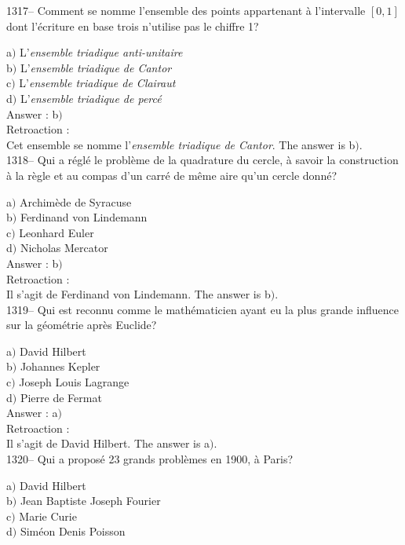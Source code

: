 ﻿\documentclass[letterpaper, 12pt]{article}
\begin{document}
1317-- Comment se nomme l'ensemble des points appartenant \`a
l'intervalle $[0,1]$ dont l'\'ecriture en base trois n'utilise pas
le chiffre 1?

a$)$ L'{\sl ensemble triadique anti-unitaire} \\
b$)$ L'{\sl ensemble triadique de Cantor} \\
c$)$ L'{\sl ensemble triadique de Clairaut} \\
d$)$ L'{\sl ensemble triadique de perc\'e}\\

Answer : b$)$\\

Retroaction : \\
Cet ensemble se nomme l'{\sl ensemble triadique de Cantor}.
The answer is  b$)$.\\

1318-- Qui a r\'egl\'e le probl\`eme de la quadrature du cercle, \`a
savoir la construction \`a la r\`egle et au compas d'un carr\'e de
m\^eme aire qu'un cercle donn\'e?

a$)$ Archim\`ede de Syracuse \\
b$)$ Ferdinand von Lindemann \\
c$)$ Leonhard Euler \\
d$)$ Nicholas Mercator\\

Answer : b$)$\\

Retroaction : \\
Il s'agit de Ferdinand von Lindemann.
The answer is  b$)$.\\

1319-- Qui est reconnu comme le math\'ematicien ayant eu la plus
grande influence sur la g\'eom\'etrie apr\`es Euclide?

a$)$ David Hilbert \\
b$)$ Johannes Kepler \\
c$)$ Joseph Louis Lagrange \\
d$)$ Pierre de Fermat\\

Answer : a$)$\\

Retroaction : \\
Il s'agit de David Hilbert.
The answer is  a$)$.\\

1320-- Qui a propos\'e 23 grands probl\`emes en 1900, \`a Paris?

a$)$ David Hilbert \\
b$)$ Jean Baptiste Joseph Fourier \\
c$)$ Marie Curie \\
d$)$ Sim\'eon Denis Poisson\\
\end{document}

